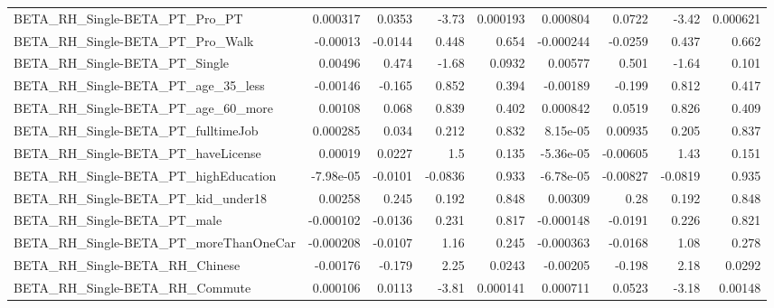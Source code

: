 \begin{tabular}{lrrrrrrrr}
BETA\_RH\_Single-BETA\_PT\_Pro\_PT                      &    0.000317 &       0.0353 &    -3.73 & 0.000193 &   0.000804 &      0.0722 &        -3.42 &      0.000621 \\
BETA\_RH\_Single-BETA\_PT\_Pro\_Walk                    &    -0.00013 &      -0.0144 &    0.448 &    0.654 &  -0.000244 &     -0.0259 &        0.437 &         0.662 \\
BETA\_RH\_Single-BETA\_PT\_Single                      &     0.00496 &        0.474 &    -1.68 &   0.0932 &    0.00577 &       0.501 &        -1.64 &         0.101 \\
BETA\_RH\_Single-BETA\_PT\_age\_35\_less                 &    -0.00146 &       -0.165 &    0.852 &    0.394 &   -0.00189 &      -0.199 &        0.812 &         0.417 \\
BETA\_RH\_Single-BETA\_PT\_age\_60\_more                 &     0.00108 &        0.068 &    0.839 &    0.402 &   0.000842 &      0.0519 &        0.826 &         0.409 \\
BETA\_RH\_Single-BETA\_PT\_fulltimeJob                 &    0.000285 &        0.034 &    0.212 &    0.832 &   8.15e-05 &     0.00935 &        0.205 &         0.837 \\
BETA\_RH\_Single-BETA\_PT\_haveLicense                 &     0.00019 &       0.0227 &      1.5 &    0.135 &  -5.36e-05 &    -0.00605 &         1.43 &         0.151 \\
BETA\_RH\_Single-BETA\_PT\_highEducation               &   -7.98e-05 &      -0.0101 &  -0.0836 &    0.933 &  -6.78e-05 &    -0.00827 &      -0.0819 &         0.935 \\
BETA\_RH\_Single-BETA\_PT\_kid\_under18                 &     0.00258 &        0.245 &    0.192 &    0.848 &    0.00309 &        0.28 &        0.192 &         0.848 \\
BETA\_RH\_Single-BETA\_PT\_male                        &   -0.000102 &      -0.0136 &    0.231 &    0.817 &  -0.000148 &     -0.0191 &        0.226 &         0.821 \\
BETA\_RH\_Single-BETA\_PT\_moreThanOneCar              &   -0.000208 &      -0.0107 &     1.16 &    0.245 &  -0.000363 &     -0.0168 &         1.08 &         0.278 \\
BETA\_RH\_Single-BETA\_RH\_Chinese                     &    -0.00176 &       -0.179 &     2.25 &   0.0243 &   -0.00205 &      -0.198 &         2.18 &        0.0292 \\
BETA\_RH\_Single-BETA\_RH\_Commute                     &    0.000106 &       0.0113 &    -3.81 & 0.000141 &   0.000711 &      0.0523 &        -3.18 &       0.00148 \\

\end{tabular}
